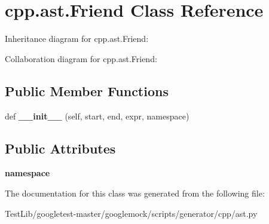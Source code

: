 \hypertarget{classcpp_1_1ast_1_1Friend}{}\section{cpp.\+ast.\+Friend Class Reference}
\label{classcpp_1_1ast_1_1Friend}


Inheritance diagram for cpp.\+ast.\+Friend\+:


Collaboration diagram for cpp.\+ast.\+Friend\+:
\subsection*{Public Member Functions}
\begin{DoxyCompactItemize}
\item 
\mbox{\label{classcpp_1_1ast_1_1Friend_a9fe245d0f14eaab85435e942a56de7e6}} 
def {\bfseries \+\_\+\+\_\+init\+\_\+\+\_\+} (self, start, end, expr, namespace)
\end{DoxyCompactItemize}
\subsection*{Public Attributes}
\begin{DoxyCompactItemize}
\item 
\mbox{\label{classcpp_1_1ast_1_1Friend_a076c68dddae9bd1e24d224d005538014}} 
{\bfseries namespace}
\end{DoxyCompactItemize}


The documentation for this class was generated from the following file\+:\begin{DoxyCompactItemize}
\item 
Test\+Lib/googletest-\/master/googlemock/scripts/generator/cpp/ast.\+py\end{DoxyCompactItemize}
